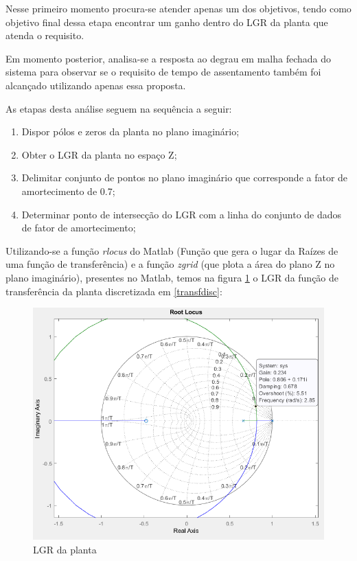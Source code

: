 \documentclass[a4paper,11pt]{article}
\begin{document}
Nesse primeiro momento procura-se atender apenas um dos objetivos, tendo como objetivo final dessa etapa encontrar um ganho dentro do LGR da planta que atenda o requisito. 

Em momento posterior, analisa-se a resposta ao degrau em malha fechada do sistema para observar se o requisito de tempo de assentamento também foi alcançado utilizando apenas essa proposta. 

As etapas desta análise seguem na sequência a seguir:

\begin{enumerate}
   \item Dispor pólos e zeros da planta no plano imaginário;
   \item Obter o LGR da planta no espaço Z;
   \item Delimitar conjunto de pontos no plano imaginário que corresponde a fator de amortecimento de 0.7;
   \item Determinar ponto de intersecção do LGR com a linha do conjunto de dados de fator de amortecimento;
 \end{enumerate}

Utilizando-se a função \textit{rlocus} do Matlab (Função que gera o lugar da Raízes de uma função de transferência) e a função \textit{zgrid} (que plota a área do plano Z no plano imaginário), presentes no Matlab, temos na figura \ref{fig:lgr} o LGR da função de transferência da planta discretizada em \ref{transfdisc}:

\begin{figure}[H]
    \centering
    \includegraphics[width=\linewidth]{src/tex/img/rlocus.PNG}
    \caption{LGR da planta}
    \label{fig:lgr}
\end{figure}
\end{document}
